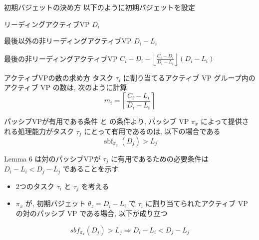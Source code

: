 \begin{frame}{初期バジェットの決め方}
    以下のように初期バジェットを設定
    \begin{block}{リーディングアクティブVP}
        $D_i$
    \end{block}
    \begin{block}{最後以外の非リーディングアクティブVP}
        $D_i - L_i$
    \end{block}
    \begin{block}{最後の非リーディングアクティブVP}
        $C_{i}-D_{i}-\left\lfloor\frac{C_{i}-D_{i}}{D_{i}-L_{i}}\right\rfloor\left(D_{i}-L_{i}\right)$
    \end{block}
\end{frame}

\begin{frame}{アクティブVPの数の求め方}
    タスク $\tau_{i}$ に割り当てるアクティブ VP グループ内のアクティブ VP の数は, 次のように計算
    \begin{equation*}
        m_{i}=\left\lceil\frac{C_{i}-L_{i}}{D_{i}-L_{i}}\right\rceil
    \end{equation*}
\end{frame}

\begin{frame}{パッシブVPが有用である条件}
     と  の条件より, パッシブ VP $\pi_{x}$ によって提供される処理能力がタスク $\tau_{j}$ にとって有用であるのは, 以下の場合である
    \begin{equation*}
        \operatorname{sbf}_{\pi_{x}}\left(D_{j}\right)>L_{j}
    \end{equation*}
\end{frame}

\begin{frame}[label=lemma6]{Lemma 6}
     は対のパッシブVPが $\tau_j$ に有用であるための必要条件は $D_{i}-L_{i}<D_{j}-L_{j}$ であることを示す
    \begin{lemma}[]
        \setlength{\linewidth}{0.98\columnwidth}
        \begin{itemize}
            \item 2つのタスク $\tau_{i}$ と $\tau_{j}$ を考える
            \item $\pi_{x}$ が, 初期バジェット $\theta_{z}=D_{i}-L_{i}$ で $\tau_{i}$ に割り当てられたアクティブ VP の対のパッシブ VP である場合, 以下が成り立つ
        \end{itemize}
        \begin{equation*}
            s b f_{\pi_{x}}\left(D_{j}\right)>L_{j} \Rightarrow D_{i}-L_{i}<D_{j}-L_{j}
        \end{equation*}
    \end{lemma}
\end{frame}

